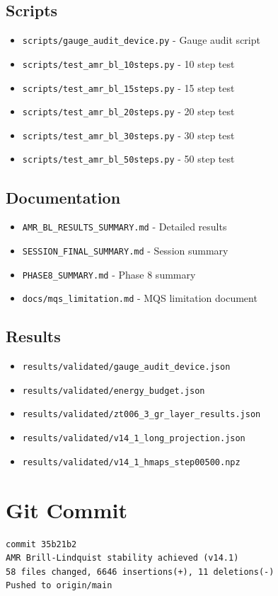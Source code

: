 \documentclass[11pt,a4paper]{article}
\begin{document}
\subsection*{Scripts}
\begin{itemize}
    \item \texttt{scripts/gauge\_audit\_device.py} - Gauge audit script
    \item \texttt{scripts/test\_amr\_bl\_10steps.py} - 10 step test
    \item \texttt{scripts/test\_amr\_bl\_15steps.py} - 15 step test
    \item \texttt{scripts/test\_amr\_bl\_20steps.py} - 20 step test
    \item \texttt{scripts/test\_amr\_bl\_30steps.py} - 30 step test
    \item \texttt{scripts/test\_amr\_bl\_50steps.py} - 50 step test
\end{itemize}

\subsection*{Documentation}
\begin{itemize}
    \item \texttt{AMR\_BL\_RESULTS\_SUMMARY.md} - Detailed results
    \item \texttt{SESSION\_FINAL\_SUMMARY.md} - Session summary
    \item \texttt{PHASE8\_SUMMARY.md} - Phase 8 summary
    \item \texttt{docs/mqs\_limitation.md} - MQS limitation document
\end{itemize}

\subsection*{Results}
\begin{itemize}
    \item \texttt{results/validated/gauge\_audit\_device.json}
    \item \texttt{results/validated/energy\_budget.json}
    \item \texttt{results/validated/zt006\_3\_gr\_layer\_results.json}
    \item \texttt{results/validated/v14\_1\_long\_projection.json}
    \item \texttt{results/validated/v14\_1\_hmaps\_step00500.npz}
\end{itemize}

\section*{Git Commit}
\begin{verbatim}
commit 35b21b2
AMR Brill-Lindquist stability achieved (v14.1)
58 files changed, 6646 insertions(+), 11 deletions(-)
Pushed to origin/main
\end{verbatim}
\end{document}
